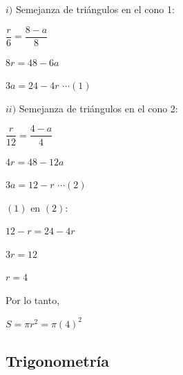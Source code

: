 \begin{enumerate}[resume]
	$i)$ Semejanza de triángulos en el cono 1:
	
	$\dfrac{r}{6}=\dfrac{8-a}{8}$
	
	$8r=48-6a$
	
	
	$3a=24-4r$  \quad $\cdots (1)$
	
	$ii)$ Semejanza de triángulos en el cono 2:
	
	$\dfrac{r}{12}=\dfrac{4-a}{4}$
	
	$4r=48-12a$
	
	$3a=12-r$ \quad $\cdots (2)$
	
	 $(1)$ en $(2)$:
	
	$12-r=24-4r$
	
	$3r=12$
	
	$r=4$
	
	Por lo tanto,
	
	$S=\pi r^2=\pi(4)^2$
	
	
	\vspace{6mm}
	
\end{enumerate}





\subsection*{Trigonometría}


